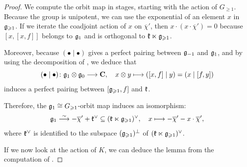 \begin{proof}
	We compute the orbit map in stages, starting with the action of $G_{\geqslant 1}$. Because the group is unipotent, we can use the exponential of an element $x$ in $\mathfrak g_{\geqslant 1}$. If we iterate the coadjoint action of $x$ on $\overline{\chi}'$, then $x \cdot (x \cdot \overline{\chi}') = 0$ because $[x, [x,f]]$ belongs to $\mathfrak g_1$ and is orthogonal to $\mathfrak k \ltimes \mathfrak g_{\geqslant 1}$. 
	
	Moreover, because $(\bullet \mid \bullet)$ gives a perfect pairing between $\mathfrak g_{-1}$ and $\mathfrak g_1$, and by using the decomposition of , we deduce that 
	\[ (\bullet \mid \bullet) \colon \mathfrak g_1 \otimes \mathfrak g_0 \longrightarrow \mathbf{C}, \quad x \otimes y \longmapsto ([x, f] \mid y) = (x \mid [f, y]) \]
	induces a perfect pairing between $[\mathfrak g_{\geqslant 1}, f]$ and $\mathfrak k$. 
	
	Therefore, the $\mathfrak g_1 \cong G_{\geqslant 1}$-orbit map induces an isomorphism:
	\[ \mathfrak g_1 \overset{\sim}{\longrightarrow} -\overline{\chi}' + \mathfrak k^\vee \subseteq (\mathfrak k \ltimes \mathfrak g_{\geqslant 1})^\vee, \quad x \longmapsto -\overline{\chi}' - x \cdot \overline{\chi}',  \]
	where $\mathfrak k^\vee$ is identified to the subspace $(\mathfrak g_{\geqslant 1})^\perp$ of $(\mathfrak k \ltimes \mathfrak g_{\geqslant 1})^\vee$.
	
	If we now look at the action of $K$, we can deduce the lemma from the computation of .
%	
\end{proof}

